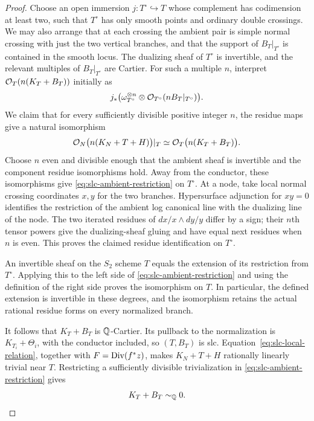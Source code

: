 \begin{proof}
Choose an open immersion $j:T^\circ\hookrightarrow T$ whose complement
has codimension at least two, such that $T^\circ$ has only smooth points
and ordinary double crossings.  We may also arrange that at each crossing
the ambient pair is simple normal crossing with just the two vertical
branches, and that the support of $B_T|_{T^\circ}$ is contained in the
smooth locus.  The dualizing
sheaf of $T^\circ$ is invertible, and the relevant multiples of
$B_T|_{T^\circ}$ are Cartier.  For such a multiple $n$, interpret
$\mathcal O_T(n(K_T+B_T))$ initially as
\[
 j_*\bigl(\omega_{T^\circ}^{\otimes n}
       \otimes\mathcal O_{T^\circ}(nB_T|_{T^\circ})\bigr).
\]
We claim that for every sufficiently divisible positive integer $n$,
the residue maps give a natural isomorphism
\begin{equation}
 \label{eq:slc-ambient-restriction}
 \mathcal O_N\bigl(n(K_N+T+H)\bigr)|_T
       \simeq \mathcal O_T\bigl(n(K_T+B_T)\bigr).
\end{equation}
Choose $n$ even and divisible enough that the ambient sheaf is
invertible and the component residue isomorphisms hold.  Away from the
conductor, these isomorphisms give
\eqref{eq:slc-ambient-restriction} on $T^\circ$.  At a node, take local
normal crossing coordinates $x,y$ for the two branches.  Hypersurface
adjunction for $xy=0$ identifies the restriction of the ambient log
canonical line with the dualizing line of the node.  The two iterated
residues of $dx/x\wedge dy/y$ differ by a sign; their $n$th tensor
powers give the dualizing-sheaf gluing and have equal next residues
when $n$ is even.  This proves the claimed residue identification on
$T^\circ$.

An invertible sheaf on the $S_2$ scheme $T$ equals the extension of
its restriction from $T^\circ$.  Applying this to the left side of
\eqref{eq:slc-ambient-restriction} and using the definition of the
right side proves the isomorphism on $T$.  In particular, the defined
extension is invertible in these degrees, and the isomorphism retains
the actual rational residue forms on every normalized branch.

It follows that $K_T+B_T$ is $\mathbb Q$-Cartier.  Its pullback to the
normalization is $K_{T_i}+\Theta_i$, with the conductor included, so
$(T,B_T)$ is slc.  Equation~\eqref{eq:slc-local-relation}, together with
$F=\operatorname{Div}(f^*z)$, makes $K_N+T+H$ rationally linearly trivial
near $T$.  Restricting a sufficiently divisible trivialization in
\eqref{eq:slc-ambient-restriction} gives
\begin{equation}
 \label{eq:slc-fibre-trivial}
 K_T+B_T\sim_{\mathbb Q}0.
\end{equation}


\end{proof}
